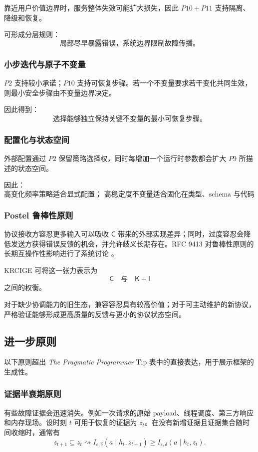 \documentclass[11pt,a4paper]{ctexart}
\numberwithin{equation}{section}
\theoremstyle{definition}
\theoremstyle{plain}
\newcommand{\Know}{\mathsf{K}}
\newcommand{\Ctrl}{\mathsf{C}}
\newcommand{\Info}{\mathsf{I}}
\newcommand{\PP}{\textit{The Pragmatic Programmer}}
\begin{document}
靠近用户价值边界时，服务整体失效可能扩大损失，因此 $P10+P11$ 支持隔离、降级和恢复。

可形成分层规则：
\[
\boxed{
\text{局部尽早暴露错误，系统边界限制故障传播。}
}
\]

\subsubsection{小步迭代与原子不变量}

$P2$ 支持较小承诺；$P10$ 支持可恢复步骤。若一个不变量要求若干变化共同生效，则最小安全步骤由不变量边界决定。

因此得到：
\[
\boxed{
\text{选择能够独立保持关键不变量的最小可恢复步骤。}
}
\]

\subsubsection{配置化与状态空间}

外部配置通过 $P2$ 保留策略选择权，同时每增加一个运行时参数都会扩大 $P9$ 所描述的状态空间。

因此：
\[
\boxed{
\text{高变化频率策略适合显式配置；
高稳定度不变量适合固化在类型、schema 与代码约束中。}
}
\]

\subsubsection{Postel 鲁棒性原则}

协议接收方容忍更多输入可以吸收 $\Ctrl$ 带来的外部实现差异；同时，过度容忍会降低发送方获得错误反馈的机会，并允许歧义长期存在。RFC 9413 对鲁棒性原则的长期互操作性影响进行了系统讨论 \cite{rfc9413}。

KRCIGE 可将这一张力表示为
\[
\Ctrl
\quad\text{与}\quad
\Know+\Info
\]
之间的权衡。

对于缺少协调能力的旧生态，兼容容忍具有较高价值；对于可主动维护的新协议，严格验证能够形成更高质量的反馈与更小的协议状态空间。

\subsection{进一步原则}

以下原则超出 \PP{} Tip 表中的直接表达，用于展示框架的生成性。

\subsubsection{证据半衰期原则}

有些故障证据会迅速消失。例如一次请求的原始 payload、线程调度、第三方响应和内存现场。设时刻 $t$ 可用于恢复的证据为 $z_t$。在没有新增证据且证据集合随时间收缩时，通常有
\[
z_{t+1}\subseteq z_t
\rightsquigarrow
I_{\varepsilon,\delta}(a\mid h_t,z_{t+1})
\ge
I_{\varepsilon,\delta}(a\mid h_t,z_t).
\]
\end{document}
